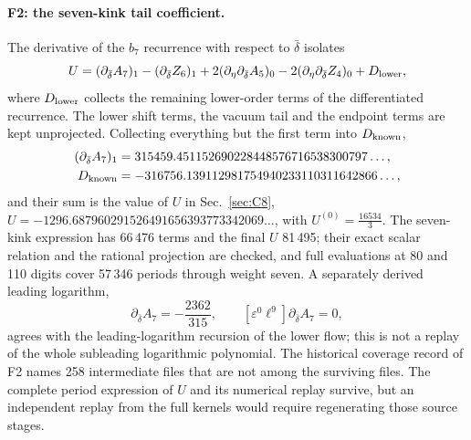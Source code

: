 \documentclass[11pt,a4paper]{article}
\numberwithin{equation}{section}
\newcommand{\db}{\bar\delta}
\begin{document}
\paragraph{F2: the seven-kink tail coefficient.} The derivative of the $b_7$ recurrence with respect to $\db$ isolates
\begin{equation}
 U=(\partial_{\db}A_7)_1-(\partial_{\db}Z_6)_1+2(\partial_\eta\partial_{\db}A_5)_0-2(\partial_\eta\partial_{\db}Z_4)_0
 +D_{\rm lower},
\end{equation}
where $D_{\rm lower}$ collects the remaining lower-order terms of the differentiated recurrence. The lower shift
terms, the vacuum tail and the endpoint terms are kept unprojected. Collecting everything but the first term into $D_{\rm known}$,
\begin{equation}
\begin{aligned}
 (\partial_{\db}A_7)_1&=315459.451152690228448576716538300797\ldots,\\
 D_{\rm known}&=-316756.139112981754940233110311642866\ldots,
\end{aligned}
\end{equation}
and their sum is the value of $U$ in Sec.~\ref{sec:C8}, $U=-1296.687960291526491656393773342069\ldots$, with
$U^{(0)}=\frac{16534}{3}$. The seven-kink expression has 66\,476 terms and the final $U$ 81\,495; their exact scalar
relation and the rational projection are checked, and full evaluations at 80 and 110 digits cover 57\,346 periods
through weight seven. A separately derived leading logarithm,
\begin{equation}
 [\varepsilon^0\ell^8]\partial_{\db}A_7=-\frac{2362}{315},\qquad [\varepsilon^0\ell^9]\partial_{\db}A_7=0,
\end{equation}
agrees with the leading-logarithm recursion of the lower flow; this is not a replay of the whole subleading logarithmic
polynomial. The historical coverage record of F2 names 258 intermediate files that are not among the surviving files.
The complete period expression of $U$ and its numerical replay survive, but an independent replay from the full kernels
would require regenerating those source stages.
\end{document}
